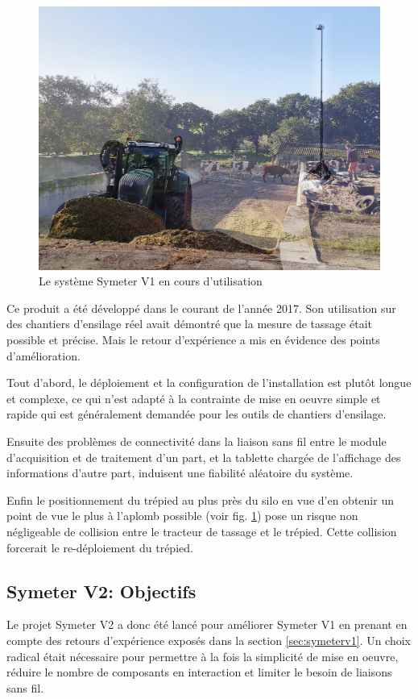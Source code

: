 \documentclass[12pt,a4paper]{report}
\begin{document}
		
		\begin{figure}[h!]
			\centering
			\includegraphics[width=0.6\linewidth]{img/symeterv1}
			\caption[symeterv1]{Le système Symeter V1 en cours d'utilisation}
			\label{fig:symeterv1}
		\end{figure}
		
		
		\para Ce produit a été développé dans le courant de l'année 2017. Son utilisation sur des chantiers d'ensilage réel avait démontré que la mesure de tassage était possible et précise. Mais le retour d'expérience a mis en évidence des points d'amélioration.
		
		\para Tout d'abord, le déploiement et la configuration de l'installation est plutôt longue et complexe, ce qui n'est adapté à la contrainte de mise en oeuvre simple et rapide qui est généralement demandée pour les outils de chantiers d'ensilage.
		
		\para Ensuite des problèmes de connectivité dans la liaison sans fil entre le module d'acquisition et de traitement d'un part, et la tablette chargée de l'affichage des informations d'autre part, induisent une fiabilité aléatoire du système.
		
		\para Enfin le positionnement du trépied au plus près du silo en vue d'en obtenir un point de vue le plus à l'aplomb possible (voir fig. \ref{fig:symeterv1}) pose un risque non négligeable de collision entre le tracteur de tassage et le trépied. Cette collision forcerait le re-déploiement du trépied.
		

		\subsection{Symeter V2: Objectifs}
		Le projet Symeter V2 a donc été lancé pour améliorer Symeter V1 en prenant en compte des retours d'expérience exposés dans la section \ref{sec:symeterv1}. Un choix radical était nécessaire pour permettre à la fois la simplicité de mise en oeuvre, réduire le nombre de composants en interaction et limiter le besoin de liaisons sans fil. 
		
\end{document}
